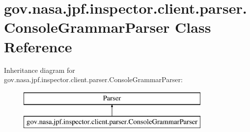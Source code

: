\hypertarget{classgov_1_1nasa_1_1jpf_1_1inspector_1_1client_1_1parser_1_1_console_grammar_parser}{}\section{gov.\+nasa.\+jpf.\+inspector.\+client.\+parser.\+Console\+Grammar\+Parser Class Reference}
\label{classgov_1_1nasa_1_1jpf_1_1inspector_1_1client_1_1parser_1_1_console_grammar_parser}
Inheritance diagram for gov.\+nasa.\+jpf.\+inspector.\+client.\+parser.\+Console\+Grammar\+Parser\+:\begin{figure}[H]
\begin{center}
\leavevmode
\includegraphics[height=2.000000cm]{classgov_1_1nasa_1_1jpf_1_1inspector_1_1client_1_1parser_1_1_console_grammar_parser}
\end{center}
\end{figure}
